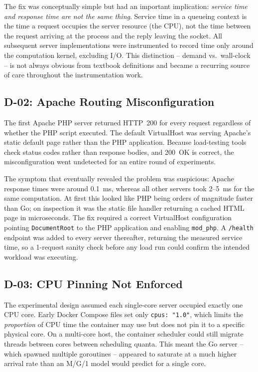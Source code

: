 The fix was conceptually simple but had an important implication: \emph{service time and response time are not the same thing}. Service time in a queueing context is the time a request occupies the server resource (the CPU), not the time between the request arriving at the process and the reply leaving the socket. All subsequent server implementations were instrumented to record time only around the computation kernel, excluding I/O. This distinction -- demand vs.\ wall-clock -- is not always obvious from textbook definitions and became a recurring source of care throughout the instrumentation work.

\subsection{D-02: Apache Routing Misconfiguration}

The first Apache PHP server returned HTTP~200 for every request regardless of whether the PHP script executed. The default VirtualHost was serving Apache's static default page rather than the PHP application. Because load-testing tools check status codes rather than response bodies, and 200~OK is correct, the misconfiguration went undetected for an entire round of experiments.

The symptom that eventually revealed the problem was suspicious: Apache response times were around 0.1~ms, whereas all other servers took 2--5~ms for the same computation. At first this looked like PHP being orders of magnitude faster than Go; on inspection it was the static file handler returning a cached HTML page in microseconds. The fix required a correct VirtualHost configuration pointing \texttt{DocumentRoot} to the PHP application and enabling \texttt{mod\_php}. A \texttt{/health} endpoint was added to every server thereafter, returning the measured service time, so a 1-request sanity check before any load run could confirm the intended workload was executing.

\subsection{D-03: CPU Pinning Not Enforced}

The experimental design assumed each single-core server occupied exactly one CPU core. Early Docker Compose files set only \texttt{cpus: "1.0"}, which limits the \emph{proportion} of CPU time the container may use but does not pin it to a specific physical core. On a multi-core host, the container scheduler could still migrate threads between cores between scheduling quanta. This meant the Go server -- which spawned multiple goroutines -- appeared to saturate at a much higher arrival rate than an M/G/1 model would predict for a single core.

